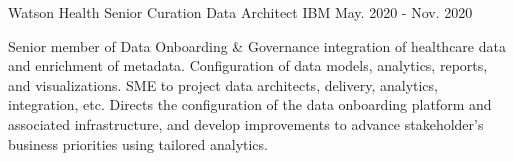 \begin{cventries}
  \cventry
    {Watson Health} %
    {Senior Curation Data Architect} %
    {IBM} %
    {May. 2020 - Nov. 2020} %
    {
      \begin{cvparagraph}
        Senior member of Data Onboarding \& Governance integration of healthcare data and enrichment of metadata. Configuration of data models, analytics, reports, and visualizations. SME to project data architects, delivery, analytics, integration, etc. Directs the configuration of the data onboarding platform and associated infrastructure, and develop improvements to advance stakeholder’s business priorities using tailored analytics.
      \end{cvparagraph}
    }


\end{cventries}
